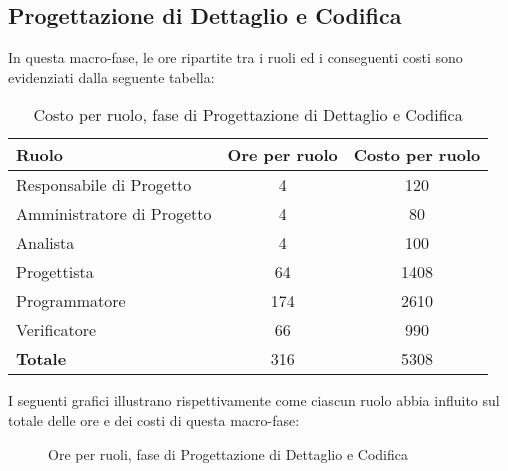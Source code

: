 \subsection{Progettazione di Dettaglio e Codifica}
In questa macro-fase, le ore ripartite tra i ruoli ed i conseguenti costi sono evidenziati dalla seguente tabella:

\begin{table}[h]
	\centering
	\begin{tabular}{|l|c|c|}
		\toprule
		\textbf{Ruolo} & \textbf{Ore per ruolo} & \textbf{Costo per ruolo} \\
		
		\midrule
		Responsabile di Progetto & 4 & 120 \\
		Amministratore di Progetto & 4 & 80 \\ 
		Analista & 4 & 100 \\
		Progettista & 64 & 1408 \\
		Programmatore & 174 & 2610 \\
		Verificatore & 66 & 990 \\
		\midrule
		\textbf{Totale} & 316 & 5308 \\
		
		\bottomrule
	\end{tabular}
	\caption{Costo per ruolo, fase di Progettazione di Dettaglio e Codifica}
\end{table}

\newpage
\noindent I seguenti grafici illustrano rispettivamente come ciascun ruolo abbia influito sul totale delle ore e dei costi di questa macro-fase:
\def\cyclelist{{"yellow","magenta","orange","green","blue","red"}}
\begin{figure}[h]
\centering
{}
\caption{Ore per ruoli, fase di Progettazione di Dettaglio e Codifica}
\end{figure}

